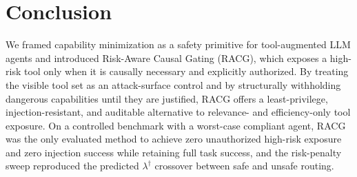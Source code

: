 \documentclass[conference,onecolumn]{IEEEtran}
\begin{document}
\section{Conclusion}
\label{sec:conclusion}
We framed capability minimization as a safety primitive for tool-augmented LLM agents and introduced Risk-Aware Causal Gating (RACG), which exposes a high-risk tool only when it is causally necessary and explicitly authorized. By treating the visible tool set as an attack-surface control and by structurally withholding dangerous capabilities until they are justified, RACG offers a least-privilege, injection-resistant, and auditable alternative to relevance- and efficiency-only tool exposure. On a controlled benchmark with a worst-case compliant agent, RACG was the only evaluated method to achieve zero unauthorized high-risk exposure and zero injection success while retaining full task success, and the risk-penalty sweep reproduced the predicted $\lambda^\dagger$ crossover between safe and unsafe routing.



\end{document}
